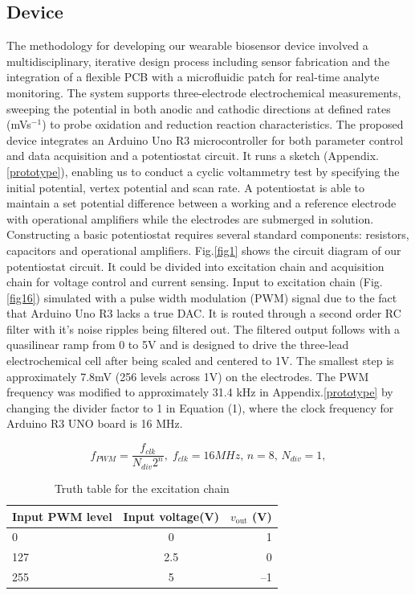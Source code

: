 \documentclass[conference]{IEEEtran}
\begin{document}
\subsection{Device}
The methodology for developing our wearable biosensor device involved a multidisciplinary, iterative design process including sensor fabrication and the integration of a flexible PCB with a microfluidic patch for real-time analyte monitoring. The system supports three-electrode electrochemical measurements, sweeping the potential in both anodic and cathodic directions at defined rates (mVs$^{-1}$) to probe oxidation and reduction reaction characteristics. The proposed device integrates an Arduino Uno R3 microcontroller for both parameter control and data acquisition and a potentiostat circuit. It runs a sketch (Appendix.\ref{prototype}), enabling us to conduct a cyclic voltammetry test by specifying the initial potential, vertex potential and scan rate. A potentiostat is able to maintain a set potential difference between a working and a reference electrode with operational amplifiers while the electrodes are submerged in solution. Constructing a basic potentiostat requires several standard components: resistors, capacitors and operational amplifiers. Fig.\ref{fig1} shows the circuit diagram of our potentiostat circuit. It could be divided into excitation chain and acquisition chain for voltage control and current sensing. Input to excitation chain (Fig.\ref{fig16}) simulated with a pulse width modulation (PWM) signal due to the fact that Arduino Uno R3 lacks a true DAC. It is routed through a second order RC filter with it's noise ripples being filtered out. The filtered output follows with a quasilinear ramp from 0 to 5V and is designed to drive the three-lead electrochemical cell after being scaled and centered to \textpm1V. The smallest step is approximately 7.8mV (256 levels across \textpm1V) on the electrodes. The PWM frequency was modified to approximately 31.4 kHz in Appendix.\ref{prototype} by changing the divider factor to 1 in Equation (1), where the clock frequency for Arduino R3 UNO board is 16 MHz. 

\begin{equation} f_{PWM} = \frac{f_{clk}}{N_{div}2^n}, \; f_{clk} = 16MHz, \, n = 8,\, N_{div} = 1,\end{equation}

\begin{table}[ht]
  \centering
  \begin{tabular}{|l|c|r|}
    \hline
    \textbf{Input PWM level} &  \textbf{Input voltage(V)} &\textbf{$v_{\mathrm{out}}$ (V)} \\ 
    \hline
    0   & 0&  1  \\
    127 & 2.5&  0  \\
    255 & 5& –1  \\ 
    \hline
  \end{tabular}
  \caption{Truth table for the excitation chain}
  \label{tab1}
\end{table}
\end{document}
